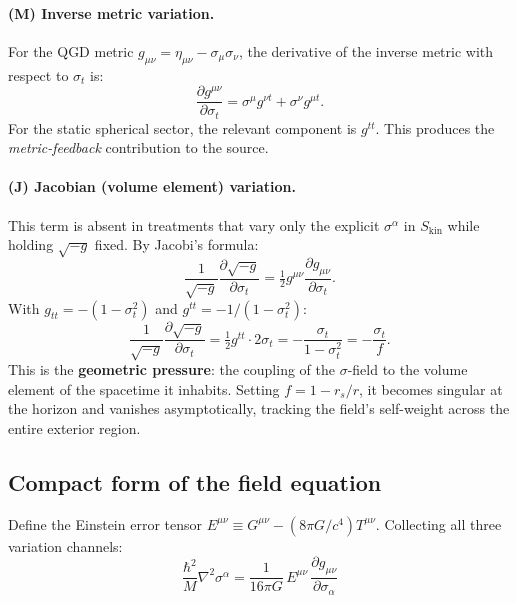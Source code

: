 \documentclass[11pt,a4paper]{article}
\theoremstyle{plain}
\theoremstyle{definition}
\theoremstyle{remark}
\newcommand{\sigt}{\sigma_t}
\newcommand{\half}{\tfrac{1}{2}}
\newcommand{\Skin}{S_{\mathrm{kin}}}
\begin{document}
\paragraph{(M) Inverse metric variation.}
For the QGD metric $g_{\mu\nu} = \eta_{\mu\nu} - \sigma_\mu\sigma_\nu$, the
derivative of the inverse metric with respect to $\sigt$ is:
\begin{equation}
  \frac{\partial g^{\mu\nu}}{\partial\sigt}
  = \sigma^\mu g^{\nu t} + \sigma^\nu g^{\mu t}.
  \label{eq:dginv}
\end{equation}
For the static spherical sector, the relevant component is $g^{tt}$.  This produces the
\emph{metric-feedback} contribution to the source.

\paragraph{(J) Jacobian (volume element) variation.}
This term is absent in treatments that vary only the explicit $\sigma^\alpha$ in $\Skin$ while holding $\sqrt{-g}$ fixed.  By Jacobi's formula:
\begin{equation}
  \frac{1}{\sqrt{-g}}\frac{\partial\sqrt{-g}}{\partial\sigt}
  = \half g^{\mu\nu}\frac{\partial g_{\mu\nu}}{\partial\sigt}.
  \label{eq:jacobi}
\end{equation}
With $g_{tt} = -(1-\sigt^2)$ and $g^{tt} = -1/(1-\sigt^2)$:
\begin{equation}
  \frac{1}{\sqrt{-g}}\frac{\partial\sqrt{-g}}{\partial\sigt}
  = \half g^{tt}\cdot 2\sigt = -\frac{\sigt}{1-\sigt^2} = -\frac{\sigt}{f}.
  \label{eq:jac_val}
\end{equation}
This is the \textbf{geometric pressure}: the coupling of the $\sigma$-field to the volume
element of the spacetime it inhabits.  Setting $f = 1 - r_s/r$, it becomes singular
at the horizon and vanishes asymptotically, tracking the field's self-weight across
the entire exterior region.

\subsection{Compact form of the field equation}

Define the Einstein error tensor $E^{\mu\nu} \equiv G^{\mu\nu} - (8\pi G/c^4)T^{\mu\nu}$.
Collecting all three variation channels:
\begin{equation}
  \boxed{\frac{\hbar^2}{M}\nabla^2\sigma^\alpha
  = \frac{1}{16\pi G}\,E^{\mu\nu}\,\frac{\partial g_{\mu\nu}}{\partial\sigma_\alpha}}
  \label{eq:compact}
\end{equation}
\end{document}
